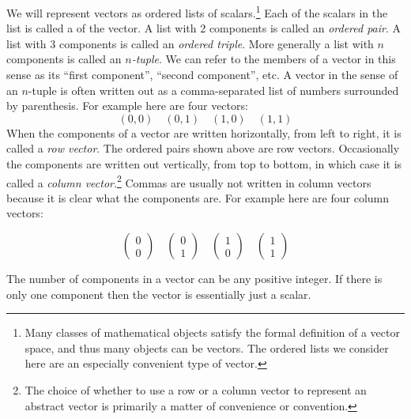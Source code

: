 We will represent vectors as ordered lists of scalars.\footnote{ Many classes of mathematical objects satisfy the formal definition
of a vector space, and thus many objects can be vectors. The ordered lists we consider here are an especially convenient type of vector.} Each of the scalars in the list is called a  
of the vector. A list with 2 components is called an {\em ordered pair}. A 
list with 3 components is called an {\em ordered triple}. More generally a
list with $n$ components is called an {\em $n$-tuple}. We can refer to the
members of a vector in this sense  as its ``first component'',  ``second component'', etc.
A vector in the sense of an $n$-tuple is often 
written out as a comma-separated list of numbers surrounded by parenthesis. 
For example here are four vectors:
\begin{equation*}
    (0,0) \quad (0,1) \quad (1,0) \quad (1,1) 
\end{equation*}
When the components of a vector are written horizontally, from left to right,
it is called a {\em row vector}. The ordered pairs shown above are row 
vectors. Occasionally the components are written out vertically, from top to 
bottom, in which case it is called a {\em column vector}.\footnote{The choice of whether
to use a row or a column vector to represent an abstract vector is primarily a matter of 
convenience or convention.}    Commas are usually 
not written in column vectors because it is clear what the components are. For 
example here are four column vectors:
\begin{small}
\begin{equation*}
\begin{pmatrix}
0 \\
0
\end{pmatrix} 
\quad 
\begin{pmatrix}
0 \\
1
\end{pmatrix} 
\quad 
\begin{pmatrix}
1 \\
0
\end{pmatrix} 
\quad 
\begin{pmatrix}
1 \\
1
\end{pmatrix} 
\end{equation*}
\end{small}
The number of components in a vector can be any positive integer. If there is
only one component then the vector is essentially just a scalar.


